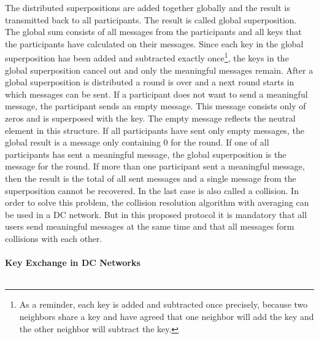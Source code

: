 The distributed superpositions are added together globally and the result is transmitted back to all participants. The result is called global superposition. The global sum consists of all messages from the participants and all keys that the participants have calculated on their messages. Since each key in the global superposition has been added and subtracted exactly once\footnote[3]{As a reminder, each key is added and subtracted once precisely, because two neighbors share a key and have agreed that one neighbor will add the key and the other neighbor will subtract the key.}, the keys in the global superposition cancel out and only the meaningful messages remain. After a global superposition is distributed a round is over and a next round starts in which messages can be sent. If a participant does not want to send a meaningful message, the participant sends an empty message. This message consists only of zeros and is superposed with the key. The empty message reflects the neutral element in this structure. If all participants have sent only empty messages, the global result is a message only containing 0 for the round. If one of all participants has sent a meaningful message, the global superposition is the message for the round. If more than one participant sent a meaningful message, then the result is the total of all sent messages and a single message from the superposition cannot be recovered. In the last case is also called a collision. In order to solve this problem, the collision resolution algorithm with averaging can be used in a DC network. But in this proposed protocol it is mandatory that all users send meaningful messages at the same time and that all messages form collisions with each other. %
\\
\\
\textbf{Key Exchange in DC Networks}
\label{subsec:key_ex}
\\
\\
